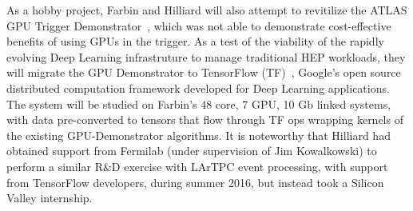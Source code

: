 
As a hobby project, Farbin and Hilliard will also attempt to
revitilize the ATLAS GPU Trigger Demonstrator~\cite{}, which was not
able to demonstrate cost-effective benefits of using GPUs in the
trigger. As a test of the viability of the rapidly evolving Deep
Learning infrastruture to manage traditional HEP workloads, they will
migrate the GPU Demonstrator to TensorFlow (TF)~\cite{}, Google's open
source distributed computation framework developed for Deep Learning
applications. The system will be studied on Farbin's 48 core, 7 GPU,
10 Gb linked systems, with data pre-converted to tensors that flow
through TF ops wrapping kernels of the existing GPU-Demonstrator
algorithms. It is noteworthy that Hilliard had obtained support from
Fermilab (under supervision of Jim Kowalkowski) to perform a similar
R\&D exercise with LArTPC event processing, with support from
TensorFlow developers, during summer 2016, but instead took a Silicon
Valley internship.




